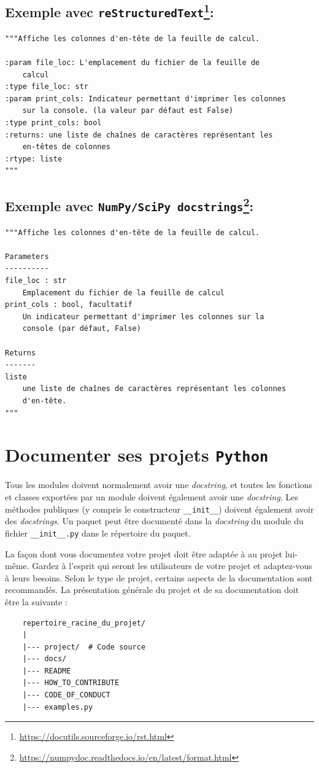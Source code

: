 \documentclass[a4paper,11pt]{book}
\begin{document}
\subsection*{Exemple avec \texttt{reStructuredText}\footnote{\url{https://docutils.sourceforge.io/rst.html}}:}
\begin{lstlisting}
"""Affiche les colonnes d'en-tête de la feuille de calcul.

:param file_loc: L'emplacement du fichier de la feuille de 
    calcul
:type file_loc: str
:param print_cols: Indicateur permettant d'imprimer les colonnes 
    sur	la console. (la valeur par défaut est False)
:type print_cols: bool
:returns: une liste de chaînes de caractères représentant les 
	en-têtes de colonnes
:rtype: liste
"""
\end{lstlisting}
\medskip

\subsection*{Exemple avec \texttt{NumPy/SciPy docstrings}\footnote{\url{https://numpydoc.readthedocs.io/en/latest/format.html}}:}
\begin{lstlisting}
"""Affiche les colonnes d'en-tête de la feuille de calcul.

Parameters
----------
file_loc : str
    Emplacement du fichier de la feuille de calcul
print_cols : bool, facultatif
    Un indicateur permettant d'imprimer les colonnes sur la 
    console (par défaut, False)

Returns
-------
liste
    une liste de chaînes de caractères représentant les colonnes 
    d'en-tête.
"""
\end{lstlisting}
\medskip

\section{Documenter ses projets \texttt{Python}}
Tous les modules doivent normalement avoir une \textit{docstring}, et toutes les fonctions et classes exportées par un module doivent également avoir une \textit{docstring}. Les méthodes publiques (y compris le constructeur \texttt{\_\_init\_\_}) doivent également avoir des \textit{docstrings}. Un paquet peut être documenté dans la \textit{docstring} du module du fichier \texttt{\_\_init\_\_.py} dans le répertoire du paquet.
\medskip

La façon dont vous documentez votre projet doit être adaptée à au projet lui-même. Gardez à l'esprit qui seront les utilisateurs de votre projet et adaptez-vous à leurs besoins. Selon le type de projet, certains aspects de la documentation sont recommandés. La présentation générale du projet et de sa documentation doit être la suivante :
\begin{verbatim}
    repertoire_racine_du_projet/
    |
    |--- project/  # Code source
    |--- docs/
    |--- README
    |--- HOW_TO_CONTRIBUTE
    |--- CODE_OF_CONDUCT
    |--- examples.py
\end{verbatim}
\medskip
\end{document}
